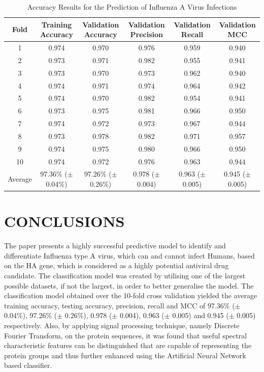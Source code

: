 \documentclass[letterpaper, 10 pt, conference]{ieeeconf}  %
\begin{document}
\begin{table}[ht]
\caption{Accuracy Results for the Prediction of Influenza A Virus Infections}
\centering
\begin{tabular}{c c c c c c}
\hline

Fold & Training Accuracy & Validation Accuracy & Validation Precision & Validation Recall & Validation MCC\\
\hline

1 & 0.974 & 0.970 & 0.976 & 0.959 & 0.940\\
2 & 0.973 & 0.971 & 0.982 & 0.955 & 0.941\\
3 & 0.973 & 0.970 & 0.973 & 0.962 & 0.940\\
4 & 0.974 & 0.971 & 0.974 & 0.964 & 0.942\\
5 & 0.974 & 0.970 & 0.982 & 0.954 & 0.941\\
6 & 0.973 & 0.975 & 0.981 & 0.966 & 0.950\\
7 & 0.974 & 0.972 & 0.973 & 0.967 & 0.944\\
8 & 0.973 & 0.978 & 0.982 & 0.971 & 0.957\\
9 & 0.974 & 0.975 & 0.980 & 0.966 & 0.950\\
10 & 0.974 & 0.972 & 0.976 & 0.963 & 0.944\\
\hline 
Average & 97.36\% ($\pm$ 0.04\%) & 97.26\% ($\pm$ 0.26\%) & 0.978 ($\pm$ 0.004) & 0.963 ($\pm$ 0.005) & 0.945 ($\pm$ 0.005)\\
\hline
\end{tabular}
\label{Results}
\end{table}





\section{CONCLUSIONS}
\label{section:conclusions}


The paper presents a highly successful predictive model to identify and differentiate Influenza type A virus, which can and cannot infect Humans, based on the HA gene, which is considered as a highly potential antiviral drug candidate. The classification model was created by utilising one of the largest possible datasets, if not the largest, in order to better generalise the model. The classification model obtained over the 10-fold cross validation yielded the average training accuracy, testing accuracy, precision, recall and MCC of 97.36\% ($\pm$ 0.04\%), 97.26\% ($\pm$ 0.26\%), 0.978 ($\pm$ 0.004), 0.963 ($\pm$ 0.005) and 0.945 ($\pm$ 0.005) respectively. Also, by applying signal processing technique, namely Discrete Fourier Transform, on the protein sequences, it was found that useful spectral characteristic features can be distinguished that are capable of representing the protein groups and thus further enhanced using the Artificial Neural Network based classifier. 
\end{document}
